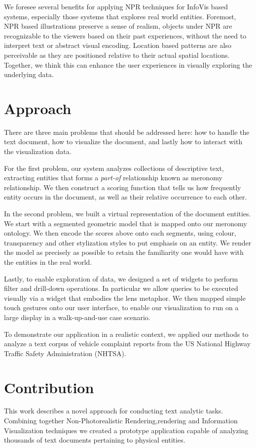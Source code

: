 We foresee several benefits for applying NPR techniques for InfoVis based
systems, especially those systems that explores real world entities. Foremost,
NPR based illustrations preserve a sense of realism, objects under NPR are
recognizable to the viewers based on their past experiences, without the need to
interpret text or abstract visual encoding. Location based patterns are also
perceivable as they are positioned relative to their actual spatial locations.
Together, we think this can enhance the user experiences in visually exploring
the underlying data.

 
\section{Approach}
There are three main problems that should be addressed here: how to handle the
text document, how to visualize the document, and lastly how to interact with
the visualization data.

For the first problem, our system analyzes collections of descriptive text,
extracting entities that forms a \emph{part-of} relationship known as meronomy
relationship. We then construct a scoring function that tells us how frequently
entity occurs in the document, as well as their relative occurrence to each
other. 
 
In the second problem, we built a virtual representation of the document
entities. We start with a segmented \threed geometric model that is mapped onto
our meronomy ontology. We then encode the scores above onto each segments, 
using colour, transparency and other stylization styles to put emphasis on  an
entity. We render the model as precisely as possible to retain the familiarity
one would have with the entities in the real world.
 
Lastly, to enable exploration of data, we designed a set of widgets to perform
filter and drill-down operations. In particular we allow queries to be executed
visually via a widget that embodies the lens metaphor. We then mapped simple
touch gestures onto our user interface, to enable our visualization to run on a
large display in a walk-up-and-use case scenario.
 
To demonstrate our application in a realistic context, we applied our methods
to analyze a text corpus of vehicle complaint reports from the US National
Highway Traffic Safety Administration (NHTSA).

 
\section{Contribution}
This work describes a novel approach for conducting text analytic tasks.
Combining together Non-Photorealistic Rendering,\threed rendering and
Information Visualization techniques we created a prototype application capable
of analyzing thousands of text documents pertaining to physical entities.
 


